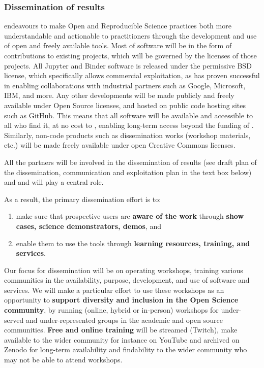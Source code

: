 \subsubsection{Dissemination of results}

 \TheProject endeavours to make Open and Reproducible Science practices both more understandable and actionable
 to practitioners through the development and use of open and freely available tools.
Most of \TheProject software will be in the form of contributions to existing projects,
which will be governed by the licenses of those projects.
All Jupyter and Binder software is released under the permissive BSD license,
which specifically allows commercial exploitation,
as has proven successful in enabling collaborations with industrial partners
such as Google, Microsoft, IBM, and more.
Any other developments will  be made publicly and freely available under Open Source licenses, and
hosted on public code hosting sites such as GitHub.
This means that all \TheProject software will be available and accessible to all who find it,
at no cost to \TheProject,
enabling long-term access beyond the funding of \TheProject.
Similarly, non-code products such as dissemination works
(workshop materials, etc.) will be made freely available under open Creative Commons licenses.


All the partners will be involved in the dissemination of \TheProject results (see draft plan of the
dissemination, communication and exploitation plan in the text box below) and
 and  will play a central role.

As a result, the primary dissemination effort is to:

\begin{enumerate}
  \item make sure that prospective users are \textbf{aware of the work} through \textbf{show cases, science demonstrators, demos}, and
  \item enable them to use the tools through \textbf{learning resources, training, and services}.
\end{enumerate}

Our focus for dissemination will be on
operating workshops, training various communities in the availability,
purpose, development, and use of \TheProject software and services.
We will make a particular effort to use these workshops as an opportunity
to \textbf{support diversity and inclusion in the Open Science community},
by running (online, hybrid or in-person) workshops for under-served and under-represented groups in the academic and
open source communities. \textbf{Free and online training} will be streamed (Twitch),
 make available to the wider community for instance on YouTube and archived on Zenodo for long-term availability and
 findability to the wider community who may not be able to attend workshops.



